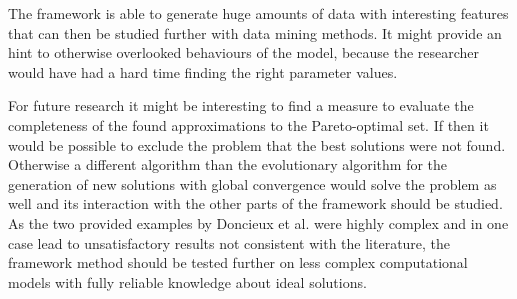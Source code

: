 \documentclass[12pt,twoside]{article}
\theoremstyle{plain}
\theoremstyle{definition}
\theoremstyle{remark}
\begin{document}
The framework is able to generate huge amounts of data with interesting features that can then be studied further with data mining methods.
It might provide an hint to otherwise overlooked behaviours of the model, because the researcher would have had a hard time finding the right parameter values.\medskip

For future research it might be interesting to find a measure to evaluate the completeness of the found approximations to the Pareto-optimal set.
If then it would be possible to exclude the problem that the best solutions were not found. 
Otherwise a different algorithm than the evolutionary algorithm for the generation of new solutions with global convergence would solve the problem as well and its interaction with the other parts of the framework should be studied.\\
As the two provided examples by Doncieux et al. were highly complex and in one case lead to unsatisfactory results not consistent with the literature, the framework method should be tested further on less complex computational models with fully reliable knowledge about ideal solutions.

%
%
\newpage


\end{document}
